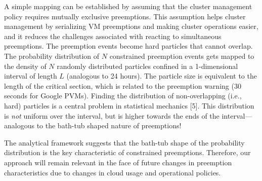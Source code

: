A simple mapping can be established by assuming that the cluster management policy requires mutually exclusive preemptions.
This assumption helps cluster management by serializing VM preemptions and making cluster operations easier, and it reduces the challenges associated with reacting to simultaneous preemptions. The preemption events become hard particles that cannot overlap. The probability distribution of $N$ constrained preemption events gets mapped to the density of $N$ randomly distributed particles confined in a 1-dimensional interval of length $L$ (analogous to 24 hours). 
The particle size is equivalent to the length of the critical section, which is related to the preemption warning (30 seconds for Google PVMs).
Finding the distribution of non-overlapping (i.e., hard) particles is a central problem in statistical mechanics [5].
This distribution is \emph{not} uniform over the interval, but is higher towards the ends of the interval---analogous to the bath-tub shaped nature of preemptions! 

The analytical framework suggests that the bath-tub shape of the probability distribution is the key characteristic of constrained preemptions.
Therefore, our approach will remain relevant in the face of future changes in preemption characteristics due to changes in cloud usage and operational policies.








